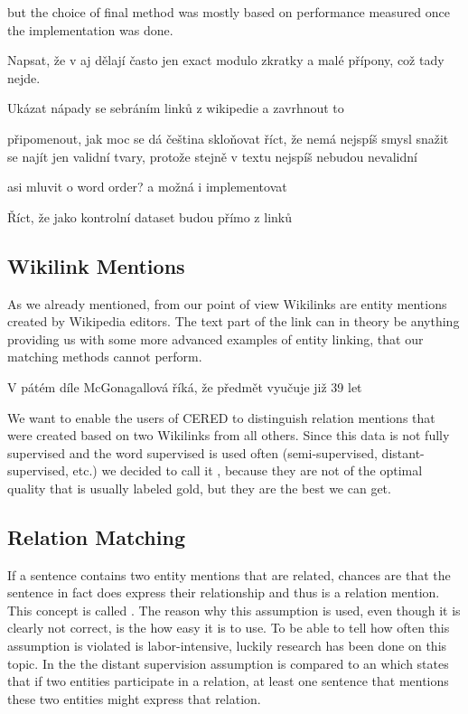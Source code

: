 but the choice of final method was mostly based on performance measured once the implementation was done.



Napsat, že v aj dělají často jen exact modulo zkratky a malé přípony, což tady nejde.

Ukázat nápady se sebráním linků z wikipedie a zavrhnout to

připomenout, jak moc se dá čeština skloňovat
říct, že nemá nejspíš smysl snažit se najít jen validní tvary, protože stejně v textu nejspíš nebudou nevalidní

asi mluvit o word order? a možná i implementovat

Říct, že jako kontrolní dataset budou přímo z linků

\subsection{Wikilink Mentions}

As we already mentioned, from our point of view Wikilinks are entity mentions created by Wikipedia editors. The text part of the link can in theory be anything providing us with some more advanced examples of entity linking, that our matching methods cannot perform.

V pátém díle McGonagallová říká, že předmět vyučuje již 39 let

We want to enable the users of CERED to distinguish relation mentions that were created based on two Wikilinks from all others. Since this data is not fully supervised and the word supervised is used often  (semi-supervised, distant-supervised, etc.) we decided to call it , because they are not of the optimal quality that is usually labeled gold, but they are the best we can get.


\subsection{Relation Matching}
If a sentence contains two entity mentions that are related, chances are that the sentence in fact does express their relationship and thus is a relation mention. This concept is called . The reason why this assumption is used, even though it is clearly not correct, is the how easy it is to use. To be able to tell how often this assumption is violated is labor-intensive, luckily research has been done on this topic. In the \cite{inproceedings}  the distant supervision assumption is compared to an  which states that if two entities participate in a relation, at least one sentence that mentions these two entities might express that relation. 

